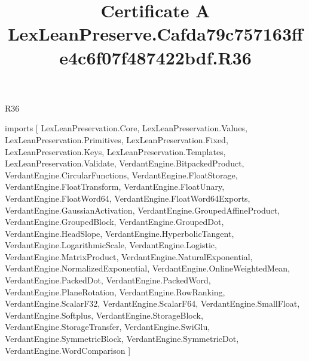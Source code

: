 \begin{lexlean}{R36}
\title{Certificate A LexLeanPreserve.Cafda79c757163ffe4c6f07f487422bdf.R36}
\begin{coremodule}
imports [
  LexLeanPreservation.Core,
  LexLeanPreservation.Values,
  LexLeanPreservation.Primitives,
  LexLeanPreservation.Fixed,
  LexLeanPreservation.Keys,
  LexLeanPreservation.Templates,
  LexLeanPreservation.Validate,
  VerdantEngine.BitpackedProduct,
  VerdantEngine.CircularFunctions,
  VerdantEngine.FloatStorage,
  VerdantEngine.FloatTransform,
  VerdantEngine.FloatUnary,
  VerdantEngine.FloatWord64,
  VerdantEngine.FloatWord64Exports,
  VerdantEngine.GaussianActivation,
  VerdantEngine.GroupedAffineProduct,
  VerdantEngine.GroupedBlock,
  VerdantEngine.GroupedDot,
  VerdantEngine.HeadSlope,
  VerdantEngine.HyperbolicTangent,
  VerdantEngine.LogarithmicScale,
  VerdantEngine.Logistic,
  VerdantEngine.MatrixProduct,
  VerdantEngine.NaturalExponential,
  VerdantEngine.NormalizedExponential,
  VerdantEngine.OnlineWeightedMean,
  VerdantEngine.PackedDot,
  VerdantEngine.PackedWord,
  VerdantEngine.PlaneRotation,
  VerdantEngine.RowRanking,
  VerdantEngine.ScalarF32,
  VerdantEngine.ScalarF64,
  VerdantEngine.SmallFloat,
  VerdantEngine.Softplus,
  VerdantEngine.StorageBlock,
  VerdantEngine.StorageTransfer,
  VerdantEngine.SwiGlu,
  VerdantEngine.SymmetricBlock,
  VerdantEngine.SymmetricDot,
  VerdantEngine.WordComparison
]


\end{coremodule}
\end{lexlean}
